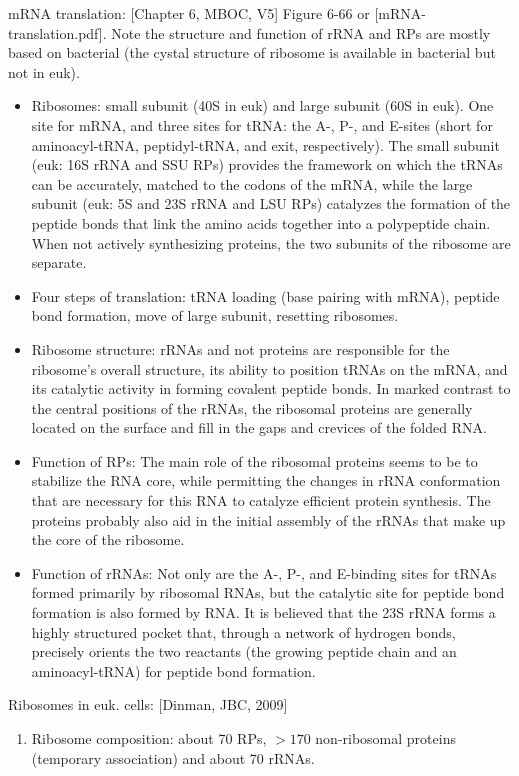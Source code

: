 \documentclass{report}
\begin{document}
\begin{enumerate}
mRNA translation: [Chapter 6, MBOC, V5] Figure 6-66 or [mRNA-translation.pdf]. Note the structure and function of rRNA and RPs are mostly based on bacterial (the cystal structure of ribosome is available in bacterial but not in euk). 
\begin{itemize}
	\item Ribosomes: small subunit (40S in euk) and large subunit (60S in euk). One site for mRNA, and three sites for tRNA: the A-, P-, and E-sites (short for aminoacyl-tRNA, peptidyl-tRNA, and exit, respectively). The small subunit (euk: 16S rRNA and SSU RPs)  provides the framework on which the tRNAs can be accurately, matched to the codons of the mRNA, while the large subunit (euk: 5S and 23S rRNA and LSU RPs) catalyzes the formation of the peptide bonds that link the amino acids together into a polypeptide chain. When not actively synthesizing proteins, the two subunits of the ribosome are separate. 
	\item Four steps of translation: tRNA loading (base pairing with mRNA), peptide bond formation, move of large subunit, resetting ribosomes. 
	\item Ribosome structure: rRNAs and not proteins are responsible for the ribosome's overall structure, its ability to position tRNAs on the mRNA, and its catalytic activity in forming covalent peptide bonds. In marked contrast to the central positions of the rRNAs, the ribosomal proteins are generally located on the surface and fill in the gaps and crevices of the folded RNA. 
	\item Function of RPs: The main role of the ribosomal proteins seems to be to stabilize the RNA core, while permitting the changes in rRNA conformation that are necessary for this RNA to catalyze efficient protein synthesis. The proteins probably also aid in the initial assembly of the rRNAs that make up the core of the ribosome.
	\item Function of rRNAs: Not only are the A-, P-, and E-binding sites for tRNAs formed primarily by ribosomal RNAs, but the catalytic site for peptide bond formation is also formed by RNA. It is believed that the 23S rRNA forms a highly structured pocket that, through a network of hydrogen bonds, precisely orients the two reactants (the growing peptide chain and an aminoacyl-tRNA) for peptide bond formation. 
\end{itemize}

Ribosomes in euk. cells: [Dinman, JBC, 2009]
\begin{enumerate}
\item Ribosome composition: about 70 RPs, $>170$ non-ribosomal proteins (temporary association) and about 70 rRNAs. 


\end{enumerate}
\end{enumerate}
\end{document}

